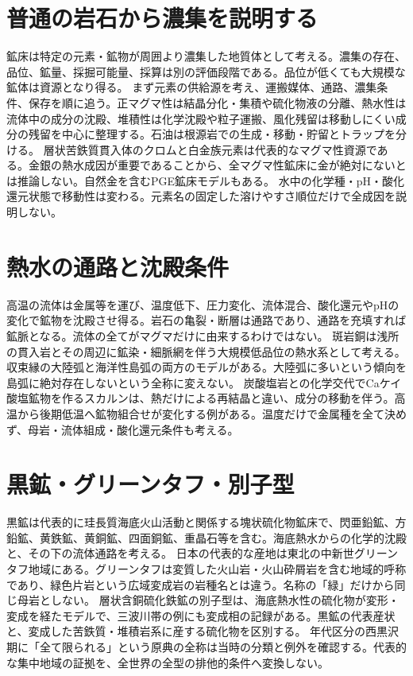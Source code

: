 \section{普通の岩石から濃集を説明する}\label{theory:ore:origins}
鉱床は特定の元素・鉱物が周囲より濃集した地質体として考える。濃集の存在、品位、鉱量、採掘可能量、採算は別の評価段階である。品位が低くても大規模な鉱体は資源となり得る。
まず元素の供給源を考え、運搬媒体、通路、濃集条件、保存を順に追う。正マグマ性は結晶分化・集積や硫化物液の分離、熱水性は流体中の成分の沈殿、堆積性は化学沈殿や粒子運搬、風化残留は移動しにくい成分の残留を中心に整理する。石油は根源岩での生成・移動・貯留とトラップを分ける。
層状苦鉄質貫入体のクロムと白金族元素は代表的なマグマ性資源である\cite{ore50_magmatic_ref}。金銀の熱水成因が重要であることから、全マグマ性鉱床に金が絶対にないとは推論しない。自然金を含むPGE鉱床モデルもある\cite{ore50_gold_exception_ref}。
水中の化学種・pH・酸化還元状態で移動性は変わる。元素名の固定した溶けやすさ順位だけで全成因を説明しない。

\section{熱水の通路と沈殿条件}\label{theory:ore:hydrothermal}
高温の流体は金属等を運び、温度低下、圧力変化、流体混合、酸化還元やpHの変化で鉱物を沈殿させ得る。岩石の亀裂・断層は通路であり、通路を充填すれば鉱脈となる。流体の全てがマグマだけに由来するわけではない。
斑岩銅は浅所の貫入岩とその周辺に鉱染・細脈網を伴う大規模低品位の熱水系として考える。収束縁の大陸弧と海洋性島弧の両方のモデルがある\cite{ore50_porphyry_ref}。大陸弧に多いという傾向を島弧に絶対存在しないという全称に変えない。
炭酸塩岩との化学交代でCaケイ酸塩鉱物を作るスカルンは、熱だけによる再結晶と違い、成分の移動を伴う。高温から後期低温へ鉱物組合せが変化する例がある\cite{ore50_skarn_ref}。温度だけで金属種を全て決めず、母岩・流体組成・酸化還元条件も考える。

\section{黒鉱・グリーンタフ・別子型}\label{theory:ore:kuroko}
黒鉱は代表的に珪長質海底火山活動と関係する塊状硫化物鉱床で、閃亜鉛鉱、方鉛鉱、黄鉄鉱、黄銅鉱、四面銅鉱、重晶石等を含む\cite{ore50_kuroko_ref}。海底熱水からの化学的沈殿と、その下の流体通路を考える。
日本の代表的な産地は東北の中新世グリーンタフ地域にある。グリーンタフは変質した火山岩・火山砕屑岩を含む地域的呼称であり、緑色片岩という広域変成岩の岩種名とは違う。名称の「緑」だけから同じ母岩としない。
層状含銅硫化鉄鉱の別子型は、海底熱水性の硫化物が変形・変成を経たモデルで、三波川帯の例にも変成相の記録がある\cite{ore50_besshi_ref}。黒鉱の代表産状と、変成した苦鉄質・堆積岩系に産する硫化物を区別する。
年代区分の西黒沢期に「全て限られる」という原典の全称は当時の分類と例外を確認する。代表的な集中地域の証拠を、全世界の全型の排他的条件へ変換しない。

